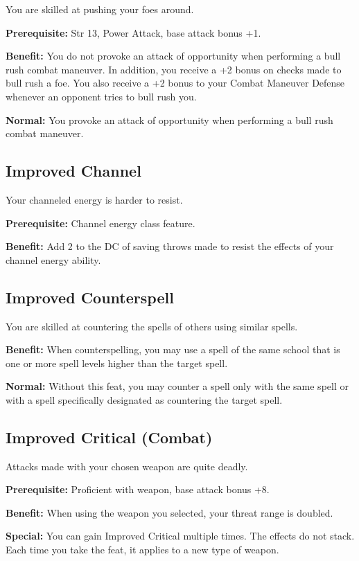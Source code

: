 				
You are skilled at pushing your foes around.
				
\textbf{Prerequisite:} Str 13, Power Attack, base attack bonus +1.
				
\textbf{Benefit:} You do not provoke an attack of opportunity when performing a bull rush combat maneuver. In addition, you receive a +2 bonus on checks made to bull rush a foe. You also receive a +2 bonus to your Combat Maneuver Defense whenever an opponent tries to bull rush you.
				
\textbf{Normal:} You provoke an attack of opportunity when performing a bull rush combat maneuver.
				
\subsection{Improved Channel}

				
Your channeled energy is harder to resist.
				
\textbf{Prerequisite:} Channel energy class feature.
				
\textbf{Benefit:} Add 2 to the DC of saving throws made to resist the effects of your channel energy ability. 
				
\subsection{Improved Counterspell}

				
You are skilled at countering the spells of others using similar spells.
				
\textbf{Benefit:} When counterspelling, you may use a spell of the same school that is one or more spell levels higher than the target spell.
				
\textbf{Normal:} Without this feat, you may counter a spell only with the same spell or with a spell specifically designated as countering the target spell.
				
\subsection{Improved Critical (Combat)}

				
Attacks made with your chosen weapon are quite deadly.
				
\textbf{Prerequisite:} Proficient with weapon, base attack bonus +8.
				
\textbf{Benefit:} When using the weapon you selected, your threat range is doubled.
				
\textbf{Special:} You can gain Improved Critical multiple times. The effects do not stack. Each time you take the feat, it applies to a new type of weapon.

